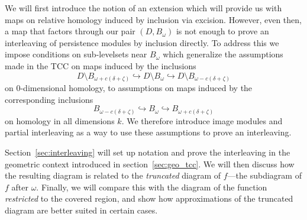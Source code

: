 

We will first introduce the notion of an extension which will provide us with maps on relative homology induced by inclusion via excision.
However, even then, a map that factors through our pair $(D, B_\omega)$ is not enough to prove an interleaving of persistence modules by inclusion directly.
To address this we impose conditions on sub-levelsets near $B_\omega$ which generalize the assumptions made in the TCC on maps induced by the inclusions
\[ D\setminus B_{\omega+c(\delta+\zeta)}\hookrightarrow D\setminus B_\omega\hookrightarrow D\setminus B_{\omega-c(\delta+\zeta)}\]
on $0$-dimensional homology, to assumptions on maps induced by the corresponding inclusions
\[ B_{\omega-c(\delta+\zeta)}\hookrightarrow B_\omega\hookrightarrow B_{\omega+c(\delta+\zeta)}\]
on homology in all dimensions $k$.
We therefore introduce image modules and partial interleaving as a way to use these assumptions to prove an interleaving.

Section~\ref{sec:interleaving} will set up notation and prove the interleaving in the geometric context introduced in section~\ref{sec:geo_tcc}.
We will then discuss how the resulting diagram is related to the \emph{truncated} diagram of $f$---the subdiagram of $f$ after $\omega$.
Finally, we will compare this with the diagram of the function \emph{restricted} to the covered region, and show how approximations of the truncated diagram are better suited in certain cases.

